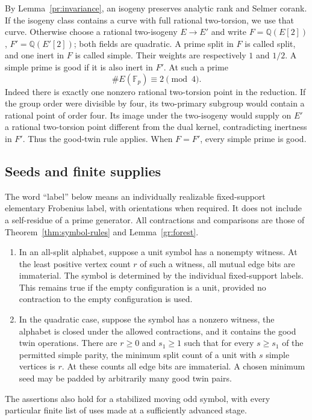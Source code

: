 By Lemma~\ref{pr:invariance}, an isogeny preserves analytic rank and
Selmer corank.  If the isogeny class contains a curve with full rational
two-torsion, we use that curve.  Otherwise choose a rational two-isogeny $E\to E'$ and write
$F=\mathbb Q(E[2])$, $F'=\mathbb Q(E'[2])$; both fields are quadratic.
A prime split in $F$ is called split, and one inert in $F$ is called simple.
Their weights are respectively $1$ and $1/2$.  A simple prime is good if it
is also inert in $F'$.  At such a prime
\begin{equation}\label{pw:good-simple}
 \#E(\mathbb F_p)\equiv2\pmod4.
\end{equation}
Indeed there is exactly one nonzero rational two-torsion point in the
reduction.  If the group order were divisible by four, its two-primary
subgroup would contain a rational point of order four.  Its image under the
two-isogeny would supply on $E'$ a rational two-torsion point different from
the dual kernel, contradicting inertness in $F'$.  Thus the good-twin rule
applies.  When $F=F'$, every simple prime is good.

\subsection{Seeds and finite supplies}\label{pw:seeds-section}

The word ``label'' below means an individually realizable fixed-support
elementary Frobenius label, with orientations when required.  It does not
include a self-residue of a prime generator.  All contractions and
comparisons are those of Theorem~\ref{thm:symbol-rules} and
Lemma~\ref{gr:forest}.

\begin{lemma}\label{pw:minimum-seeds}
\begin{enumerate}
\item In an all-split alphabet, suppose a unit symbol has a nonempty
witness.  At the least positive vertex count $r$ of such a witness, all
mutual edge bits are immaterial.  The symbol is determined by the individual
fixed-support labels.  This remains true if the empty configuration is a
unit, provided no contraction to the empty configuration is used.
\item In the quadratic case, suppose the symbol has a nonzero witness,
the alphabet is closed under the allowed contractions, and it contains
the good twin operations.  There are
$r\ge0$ and $s_1\ge1$ such that for every $s\ge s_1$ of the permitted simple
parity, the minimum split count of a unit with $s$ simple vertices is $r$.
At these counts all edge bits are immaterial.  A chosen minimum seed may be
padded by arbitrarily many good twin pairs.
\end{enumerate}
The assertions also hold for a stabilized moving odd symbol, with every
particular finite list of uses made at a sufficiently advanced stage.
\end{lemma}

